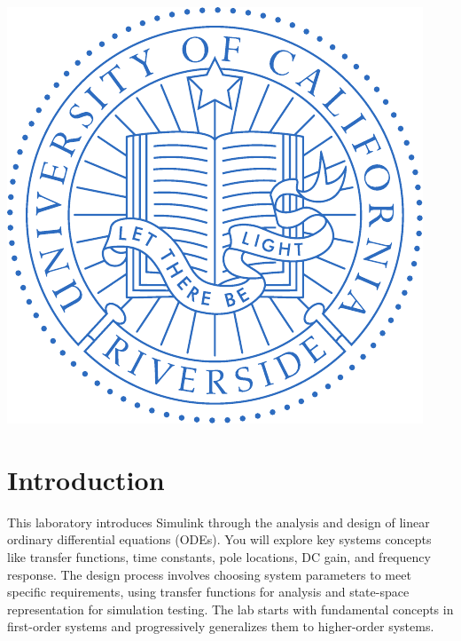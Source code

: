 \documentclass[12pt]{article}
\begin{document}
\begin{titlepage}
		\newcommand*{\plogo}{\includegraphics{Code/Fig/UC_Riverside_seal.pdf}}
		
		\plogo\\[1cm] %
		
		
		\vfill %
	\end{titlepage}
	
	\newpage
	
	\tableofcontents
	\pagebreak
	\listoffigures
	\lstlistoflistings  
	\pagebreak
	
	
	\section{Introduction}
	This laboratory introduces Simulink through the analysis and design of linear ordinary differential equations (ODEs). You will explore key systems concepts like transfer functions, time constants, pole locations, DC gain, and frequency response. The design process involves choosing system parameters to meet specific requirements, using transfer functions for analysis and state-space representation for simulation testing. The lab starts with fundamental concepts in first-order systems and progressively generalizes them to higher-order systems.
	
\end{document}
